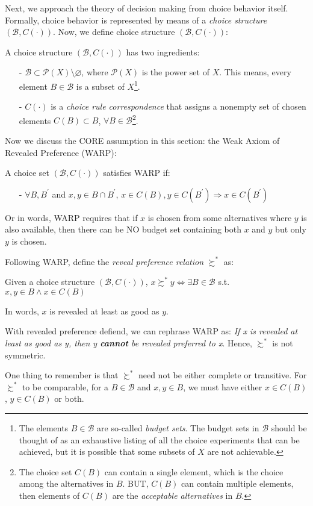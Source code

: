 Next, we approach the theory of decision making from choice behavior itself. Formally, choice behavior is represented by means of a \textit{choice structure} $(\mathcal{B},C(\cdot))$. Now, we define choice structure $(\mathcal{B},C(\cdot))$:
\begin{definition}
    A choice structure $(\mathcal{B},C(\cdot))$ has two ingredients:
    \begin{enumerate}
        \item[-] $\mathcal{B}\subset \mathcal{P}(X)\setminus\varnothing$, where $\mathcal{P}(X)$ is the power set of $X$. This means, every element $B\in \mathcal{B}$ is a subset of $X$\footnote{The elements $B\in\mathcal{B}$ are so-called \textit{budget sets}. The budget sets in $\mathcal{B}$ should be thought of as an exhaustive listing of all the choice experiments that can be achieved, but it is possible that some subsets of $X$ are not achievable.}.
        \item[-] $C(\cdot)$ is a \textit{choice rule correspondence} that assigns a nonempty set of chosen elements $C(B)\subset B$, $\forall B\in \mathcal{B}$\footnote{The choice set $C(B)$ can contain a single element, which is the choice among the alternatives in $B$. BUT, $C(B)$ can contain multiple elements, then elements of $C(B)$ are the \textit{acceptable alternatives} in $B$.}.
    \end{enumerate}
\end{definition}

Now we discuss the CORE assumption in this section: the Weak Axiom of Revealed Preference (WARP):
\begin{definition}
    A choice set $(\mathcal{B},C(\cdot))$ satisfies WARP if:
    \begin{enumerate}
        \item[-] $\forall B,B^{\prime}$ and $x,y\in B\cap B^{\prime}$, $x\in C(B),y\in C(B^{\prime})\Rightarrow x\in C(B^{\prime})$
    \end{enumerate}
\end{definition}

Or in words, WARP requires that if $x$ is chosen from some alternatives where $y$ is also available, then there can be NO budget set containing both $x$ and $y$
but only $y$ is chosen.

Following WARP, define the \textit{reveal preference relation} $\succsim^*$ as:
\begin{definition}
    Given a choice structure $(\mathcal{B},C(\cdot))$, $x\succsim^*y\Leftrightarrow \exists B\in\mathcal{B}$ s.t. $x,y\in B\land x\in C(B)$
\end{definition}
In words, $x$ is revealed at least as good as $y$.

With revealed preference defiend, we can rephrase WARP as: \textit{If x is revealed at least as good as y, then y \textbf{cannot} be revealed preferred to x}. Hence, $\succsim^*$ is not symmetric.

One thing to remember is that $\succsim^*$ need not be either complete or transitive. For $\succsim^*$ to be comparable, for a $B\in\mathcal{B}$ and $x,y\in B$, we must have either $x\in C(B)$, $y\in C(B)$ or both.
